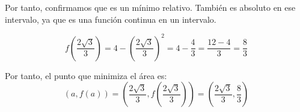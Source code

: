 \documentclass[12pt]{article}
\begin{document}
\begin{ejercicio}
\begin{enumerate}
    Por tanto, confirmamos que es un mínimo relativo. También es absoluto en ese intervalo, ya que es una función continua en un intervalo.

    \begin{equation*}
        f\left(\frac{2\sqrt{3}}{3}\right) = 4-\left(\frac{2\sqrt{3}}{3}\right)^2 = 4-\frac{4}{3} = \frac{12-4}{3} = \frac{8}{3}
    \end{equation*}

    Por tanto, el punto que minimiza el área es:
    \begin{equation*}
        (a,f(a)) = \left(\frac{2\sqrt{3}}{3}, f\left(\frac{2\sqrt{3}}{3}\right)\right) = \left(\frac{2\sqrt{3}}{3}, \frac{8}{3}\right)
    \end{equation*}
\end{enumerate}
\end{ejercicio}
\end{document}
